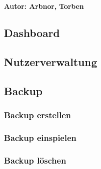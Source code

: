 
\textbf{Autor: Arbnor, Torben} \\

\subsection{Dashboard}

\subsection{Nutzerverwaltung}

\subsection{Backup}
\subsubsection{Backup erstellen}
\subsubsection{Backup einspielen}
\subsubsection{Backup löschen}